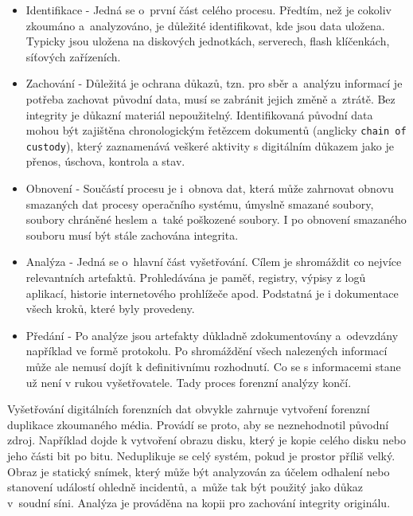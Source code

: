 \begin{itemize}
\item Identifikace - Jedná se o~první část celého procesu. Předtím, než je cokoliv zkoumáno a~analyzováno, je důležité identifikovat, kde jsou data uložena. Typicky jsou uložena na diskových jednotkách, serverech, flash klíčenkách, síťových zařízeních.

\item Zachování - Důležitá je ochrana důkazů, tzn. pro sběr a~analýzu informací je potřeba zachovat původní data, musí se zabránit jejich změně a~ztrátě. Bez integrity je důkazní materiál nepoužitelný. Identifikovaná původní data mohou být zajištěna chronologickým řetězcem dokumentů (anglicky \texttt{chain of custody}), který zaznamenává veškeré aktivity s digitálním důkazem jako je přenos, úschova, kontrola a stav.

\item Obnovení - Součástí procesu je i~obnova dat, která může zahrnovat obnovu smazaných dat procesy operačního systému, úmyslně smazané soubory, soubory chráněné heslem a~také poškozené soubory. I po obnovení smazaného souboru musí být stále zachována integrita.

\item Analýza - Jedná se o~hlavní část vyšetřování. Cílem je shromáždit co nejvíce relevantních artefaktů. Prohledávána je paměť, registry, výpisy z logů aplikací, historie internetového prohlížeče apod. Podstatná je i dokumentace všech kroků, které byly provedeny.

\item Předání - Po analýze jsou artefakty důkladně zdokumentovány a~odevzdány například ve formě protokolu. Po shromáždění všech nalezených informací může ale nemusí dojít k definitivnímu rozhodnutí. Co se s informacemi stane už není v rukou vyšetřovatele. Tady proces forenzní analýzy končí.
\end{itemize}

\noindent Vyšetřování digitálních forenzních dat obvykle zahrnuje vytvoření forenzní duplikace zkoumaného média. Provádí se proto, aby se neznehodnotil původní zdroj. Například dojde k vytvoření obrazu disku, který je kopie celého disku nebo jeho části bit po bitu. Neduplikuje se celý systém, pokud je prostor příliš velký. Obraz je statický snímek, který může být analyzován za účelem odhalení nebo stanovení událostí ohledně incidentů, a~může tak být použitý jako důkaz v~soudní síni. Analýza je prováděna na kopii pro zachování integrity originálu.

